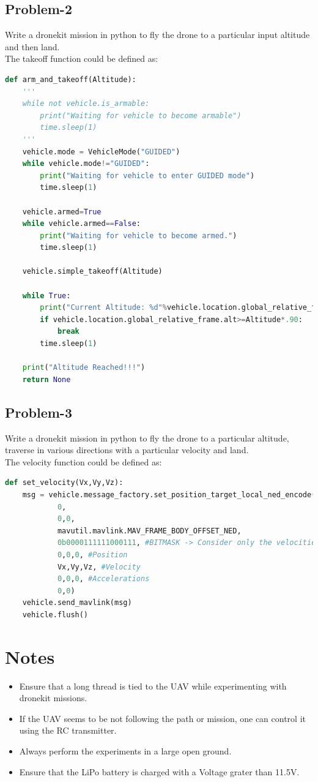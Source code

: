 \documentclass{article}
\begin{document}
\subsection{Problem-2}
Write a dronekit mission in python to fly the drone to a particular input altitude and then land.\\
The takeoff function could be defined as:
\begin{lstlisting}[language=Python]
def arm_and_takeoff(Altitude):
    '''
    while not vehicle.is_armable:
        print("Waiting for vehicle to become armable")
        time.sleep(1)
    '''
    vehicle.mode = VehicleMode("GUIDED")
    while vehicle.mode!="GUIDED":
        print("Waiting for vehicle to enter GUIDED mode")
        time.sleep(1)

    vehicle.armed=True
    while vehicle.armed==False:
        print("Waiting for vehicle to become armed.")
        time.sleep(1)

    vehicle.simple_takeoff(Altitude)
    
    while True:
        print("Current Altitude: %d"%vehicle.location.global_relative_frame.alt)
        if vehicle.location.global_relative_frame.alt>=Altitude*.90:
            break
        time.sleep(1)

    print("Altitude Reached!!!")
    return None

\end{lstlisting}

\subsection{Problem-3}
Write a dronekit mission in python to fly the drone to a particular altitude, traverse in various directions with a particular velocity and land.\\
The velocity function could be defined as:
\begin{lstlisting}[language=Python]
def set_velocity(Vx,Vy,Vz):
    msg = vehicle.message_factory.set_position_target_local_ned_encode(
            0,
            0,0,
            mavutil.mavlink.MAV_FRAME_BODY_OFFSET_NED,
            0b0000111111000111, #BITMASK -> Consider only the velocities
            0,0,0, #Position
            Vx,Vy,Vz, #Velocity
            0,0,0, #Accelerations
            0,0)
    vehicle.send_mavlink(msg)
    vehicle.flush()

\end{lstlisting}

\section{Notes}
\begin{itemize}
    \item Ensure that a long thread is tied to the UAV while experimenting with dronekit missions.
    \item If the UAV seems to be not following the path or mission, one can control it using the RC transmitter. 
    \item Always perform the experiments in a large open ground. 
    \item Ensure that the LiPo battery is charged with a Voltage grater than 11.5V.
\end{itemize}
\end{document}
